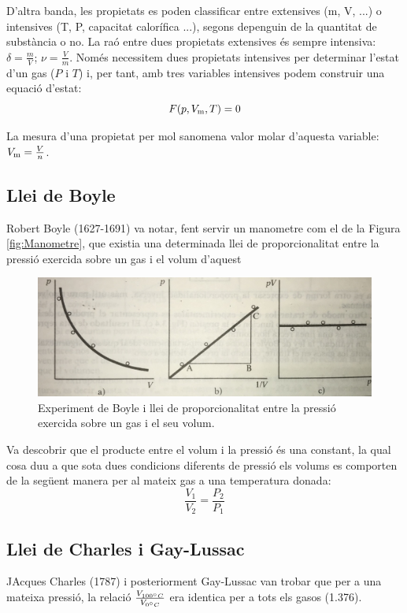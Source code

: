 D'altra banda, les propietats es poden classificar entre extensives (m, V, ...) o intensives (T, P, capacitat calorífica ...), segons depenguin de la quantitat de substància o no. La raó entre dues propietats extensives és sempre intensiva: $\delta = \frac{m}{V}$; $\nu = \frac{V}{m}$. Només necessitem dues propietats intensives per determinar l'estat d'un gas ($P$ i $T$) i, per tant, amb tres variables intensives podem construir una equació d'estat: 
\[F(p,V_{\rm m},T)=0\]

La mesura d'una propietat per mol sanomena valor molar d'aquesta variable: $V_{\rm m} = \frac{V}{n}$. 
\subsection{Llei de Boyle}

Robert Boyle (1627-1691) va notar, fent servir un manometre com el de la Figura \ref{fig:Manometre}, que existia una determinada llei de proporcionalitat entre la pressió exercida sobre un gas i el volum d'aquest
\begin{figure}[h]
\centering
\includegraphics[scale=0.10]{figures/Boyle.png}
\caption{Experiment de Boyle i llei de proporcionalitat entre la pressió exercida sobre un gas i el seu volum.}
\label{fig:Boyle}
\end{figure}
Va descobrir que el producte entre el volum i la pressió és una constant, la qual cosa duu a que sota dues condicions diferents de pressió els volums es comporten de la següent manera per al mateix gas a una temperatura donada:
\[
\frac{V_1}{V_2}=\frac{P_2}{P_1}
\]


\subsection{Llei de Charles i Gay-Lussac}

JAcques Charles (1787) i posteriorment Gay-Lussac van trobar que per a una mateixa pressió, la relació $\frac{V_{100 \degree C}}{V_{0 \degree C}}$ era identica per a tots els gasos (1.376).

